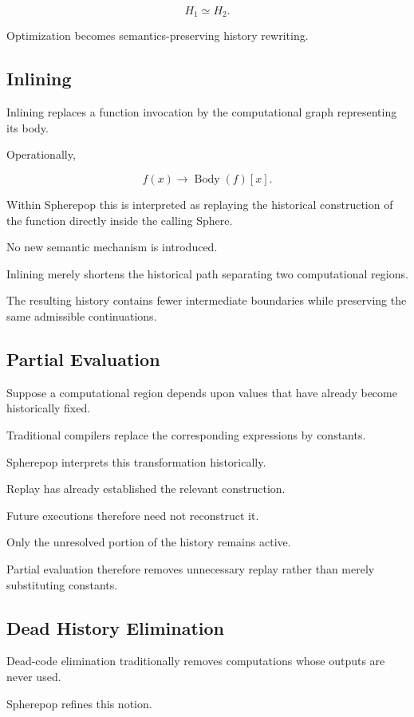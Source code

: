 \documentclass[12pt,oneside]{article}
\theoremstyle{definition}
\theoremstyle{remark}
\begin{document}
\[
H_1 \simeq H_2.
\]

Optimization becomes semantics-preserving history rewriting.

\subsection{Inlining}

Inlining replaces a function invocation by the computational graph
representing its body.

Operationally,

\[
f(x)
\longrightarrow
\operatorname{Body}(f)[x].
\]

Within Spherepop this is interpreted as replaying the historical construction
of the function directly inside the calling Sphere.

No new semantic mechanism is introduced.

Inlining merely shortens the historical path separating two computational
regions.

The resulting history contains fewer intermediate boundaries while preserving
the same admissible continuations.

\subsection{Partial Evaluation}

Suppose a computational region depends upon values that have already become
historically fixed.

Traditional compilers replace the corresponding expressions by constants.

Spherepop interprets this transformation historically.

Replay has already established the relevant construction.

Future executions therefore need not reconstruct it.

Only the unresolved portion of the history remains active.

Partial evaluation therefore removes unnecessary replay rather than merely
substituting constants.

\subsection{Dead History Elimination}

Dead-code elimination traditionally removes computations whose outputs are
never used.

Spherepop refines this notion.
\end{document}
